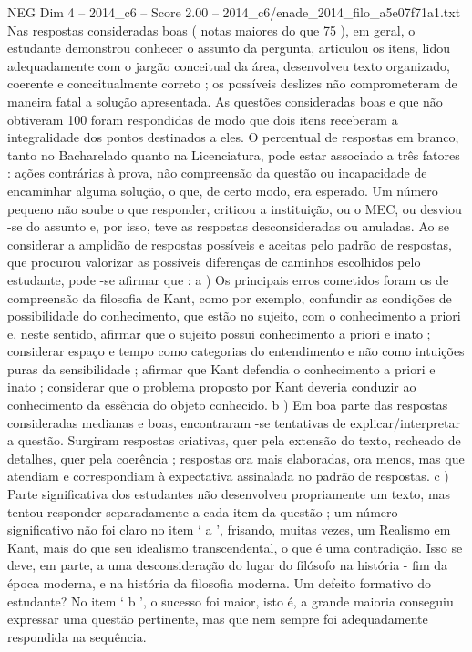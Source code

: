 \begin{textsample}{NEG Dim 4 – 2014\_c6 – Score 2.00 – 2014\_c6/enade\_2014\_filo\_a5e07f71a1.txt}
Nas respostas consideradas boas ( notas maiores do que 75 ), em geral, o estudante demonstrou conhecer o assunto da pergunta, articulou os itens, lidou adequadamente com o jargão conceitual da área, desenvolveu texto organizado, coerente e conceitualmente correto ; os possíveis deslizes não comprometeram de maneira fatal a solução apresentada.
As questões consideradas boas e que não obtiveram 100 foram respondidas de modo que dois itens receberam a integralidade dos pontos destinados a eles.
O percentual de respostas em branco, tanto no Bacharelado quanto na Licenciatura, pode estar associado a três fatores : ações contrárias à prova, não compreensão da questão ou incapacidade de encaminhar alguma solução, o que, de certo modo, era esperado.
Um número pequeno não soube o que responder, criticou a instituição, ou o MEC, ou desviou -se do assunto e, por isso, teve as respostas desconsideradas ou anuladas.
Ao se considerar a amplidão de respostas possíveis e aceitas pelo padrão de respostas, que procurou valorizar as possíveis diferenças de caminhos escolhidos pelo estudante, pode -se afirmar que : a ) Os principais erros cometidos foram os de compreensão da filosofia de Kant, como por exemplo, confundir as condições de possibilidade do conhecimento, que estão no sujeito, com o conhecimento a priori e, neste sentido, afirmar que o sujeito possui conhecimento a priori e inato ; considerar espaço e tempo como categorias do entendimento e não como intuições puras da sensibilidade ; afirmar que Kant defendia o conhecimento a priori e inato ; considerar que o problema proposto por Kant deveria conduzir ao conhecimento da essência do objeto conhecido. b ) Em boa parte das respostas consideradas medianas e boas, encontraram -se tentativas de explicar/interpretar a questão.
Surgiram respostas criativas, quer pela extensão do texto, recheado de detalhes, quer pela coerência ; respostas ora mais elaboradas, ora menos, mas que atendiam e correspondiam à expectativa assinalada no padrão de respostas. c ) Parte significativa dos estudantes não desenvolveu propriamente um texto, mas tentou responder separadamente a cada item da questão ; um número significativo não foi claro no item ‘ a ’, frisando, muitas vezes, um Realismo em Kant, mais do que seu idealismo transcendental, o que é uma contradição.
Isso se deve, em parte, a uma desconsideração do lugar do filósofo na história - fim da época moderna, e na história da filosofia moderna.
Um defeito formativo do estudante?
No item ‘ b ’, o sucesso foi maior, isto é, a grande maioria conseguiu expressar uma questão pertinente, mas que nem sempre foi adequadamente respondida na sequência.

\end{textsample}
